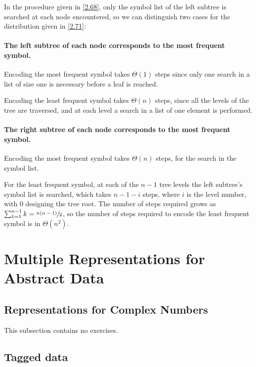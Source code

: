 \begin{exe}[2.72]
    In the  procedure given in \autoref{2.68}, only the 
    symbol list of the left subtree is searched at each node encountered, so we 
    can distinguish two cases for the distribution given in \autoref{2.71}:

    \paragraph*{The left subtree of each node corresponds to the most frequent 
    symbol.}
    Encoding the most frequent symbol takes $\Theta(1)$ steps since only 
    one search in a list of size one is necessary before a leaf is reached.

    Encoding the least frequent symbol takes $\Theta(n)$ steps, since 
    all the levels of the tree are traversed, and at each level a search in 
    a list of one element is performed.

    \paragraph*{The right subtree of each node corresponds to the most frequent 
    symbol.}
    Encoding the most frequent symbol takes $\Theta(n)$ steps, for the search in 
    the symbol list.

    For the least frequent symbol, at each of the $n - 1$ tree levels the left 
    subtree’s symbol list is searched, which takes $n - 1 - i$ steps, where $i$ 
    is the level number, with $0$ designing the tree root. The number of steps 
    required grows as $\sum_{k = 1}^{n - 1} k = \sfrac{n (n - 1)}{2}$, so the 
    number of steps required to encode the least frequent symbol is in 
    $\Theta(n^2)$.
\end{exe}

\section{Multiple Representations for Abstract Data}

\subsection{Representations for Complex Numbers}

This subsection contains no exercises.

\subsection{Tagged data}

